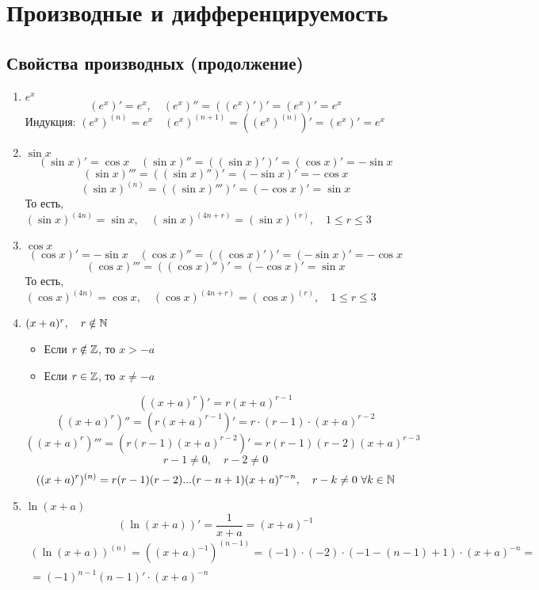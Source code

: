 \chapter{Производные и дифференцируемость}

\section{Свойства производных (продолжение)}\label{sec:1}

\begin{properties}
\begin{enumerate}
    \hfill
	\item $e^x$
    $$ (e^x)' = e^x, \quad (e^x)'' = ((e^x)')' = (e^x)' = e^x $$
    Индукция: $ (e^x)^{(n)} = e^x \quad (e^x)^{(n + 1)} = ((e^x)^{(n)})' = (e^x)' = e^x$
    \item $\sin x$
    $$ (\sin x)' = \cos x \quad (\sin x)'' = ((\sin x)')' = (\cos x)' = - \sin x$$
    $$ (\sin x)''' = ((\sin x)'')' = (-\sin x)' = -\cos x $$
    $$ (\sin x)^{(n)} = ((\sin x)''')' = (-\cos x)' = \sin x $$
    То есть, $(\sin x)^{(4n)} = \sin x, \quad (\sin x)^{(4n + r)} = (\sin x)^{(r)}, \quad 1 \le r \le 3 $
    \item $\cos x$
    $$ (\cos x)' = -\sin x \quad (\cos x)'' = ((\cos x)')' = (-\sin x)' = -\cos x$$
    $$ (\cos x)''' = ((\cos x)'')' = (-\cos x)' = \sin x $$
    То есть, $ (\cos x)^{(4n)} = \cos x, \quad (\cos x)^{(4n+r)} = (\cos x)^{(r)}, \quad 1 \le r \le 3 $
    \item $(x + a)^r, \quad r \notin \mathbb{N} $
    \begin{itemize}
    	\item Если $ r \notin \mathbb{Z}$, то $x > -a$
        \item Если $ r \in \mathbb{Z}$, то $x \ne -a $
    \end{itemize}
    $$ ((x+a)^r)' = r(x+a)^{r-1} $$
    $$ ((x+a)^r)'' = (r(x+a)^{r-1})' = r \cdot (r-1) \cdot (x+a)^{r-2} $$
    $$ ((x + a)^r)''' = (r(r-1)(x+a)^{r-2})' = r(r-1)(r-2)(x+a)^{r-3} $$
    $$ r-1 \ne 0, \quad r-2 \ne 0 $$
    $$ ((x+a)^r)^{(n)} = r(r-1)(r-2)...(r-n+1)(x+a)^{r-n}, \quad r - k \ne 0 ~ \forall k \in \mathbb{N} $$
    \item $ \ln (x+a) $
    $$ (\ln (x+a))' = \frac1{x+a} = (x+a)^{-1} $$
    \begin{multline*}
         (\ln (x+a))^{(n)} = ((x+a)^{-1})^{(n-1)} = (-1) \cdot (-2) \cdot (-1-(n-1)+1) \cdot (x+a)^{-n} = \\ = (-1)^{n-1}(n-1)' \cdot (x+a)^{-n}

\end{multline*}
\end{enumerate}
\end{properties}
